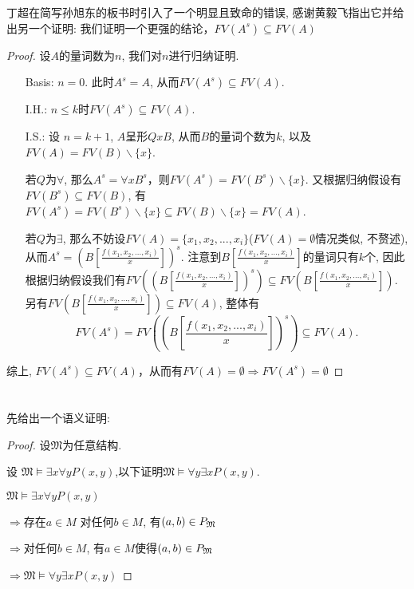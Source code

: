 \documentclass{article}
\begin{document}
\section{}
丁超在简写孙旭东的板书时引入了一个明显且致命的错误, 感谢黄毅飞指出它并给出另一个证明: 我们证明一个更强的结论，$FV(A^s) \subseteq FV(A)$
\begin{proof}
设$A$的量词数为$n$, 我们对$n$进行归纳证明. 
\begin{itemize}
	\item[Basis:] $n = 0$. 此时$A^s = A$, 从而$FV(A^s) \subseteq FV(A)$.
	\item[I.H.:] $n \le k$时$FV(A^s) \subseteq FV(A)$. 
	\item[I.S.:] 设 $n = k + 1$, $A$呈形$Q x B$, 从而$B$的量词个数为$k$, 以及$FV(A) = FV(B) \backslash \{x\}$. 
	
	若$Q$为$\forall$, 那么$A^s = \forall x B^s$，则$FV(A^s) = FV(B^s) \backslash \{x\}$. 又根据归纳假设有$FV(B^s) \subseteq FV(B)$, 有$FV(A^s) = FV(B^s) \backslash \{x\} \subseteq FV(B) \backslash \{x\} = FV(A)$. 
	
	若$Q$为$\exists$, 那么不妨设$FV(A) = \{x_1,x_2,...,x_i\}$($FV(A)=\emptyset$情况类似, 不赘述), 从而$A^s = (B[\frac{f(x_1,x_2,...,x_i)}{x}])^s$. 注意到$B[\frac{f(x_1,x_2,...,x_i)}{x}]$的量词只有$k$个, 因此根据归纳假设我们有$FV((B[\frac{f(x_1,x_2,...,x_i)}{x}])^s) \subseteq FV(B[\frac{f(x_1,x_2,...,x_i)}{x}])$. 	另有$FV(B[\frac{f(x_1,x_2,...,x_i)}{x}]) \subseteq FV(A)$, 整体有
	$$FV(A^s)=FV((B[\frac{f(x_1,x_2,...,x_i)}{x}])^s)  \subseteq FV(A).$$ 			
\end{itemize}
综上, $FV(A^s)  \subseteq FV(A)$，从而有$FV(A) = \emptyset \Rightarrow FV(A^s) = \emptyset$
\end{proof}
\section{}
先给出一个语义证明:

\begin{proof}
	
设$\mathfrak{M}$为任意结构.

设 $\mathfrak{M} \vDash \exists x \forall y P(x,y)$,以下证明$\mathfrak{M} \vDash \forall y \exists x  P(x,y)$. 

$\mathfrak{M} \vDash \exists x \forall y P(x,y)$

$\Rightarrow$存在$a \in M$ 对任何$b\in M$, 有$(a,b)\in P_{\frak{M}}$

$ \Rightarrow$对任何$b\in M$, 有$a\in M$使得$(a,b)\in P_{\frak{M}}$

$\Rightarrow \mathfrak{M}\vDash \forall y \exists x  P(x,y)$
\end{proof}
\end{document}
